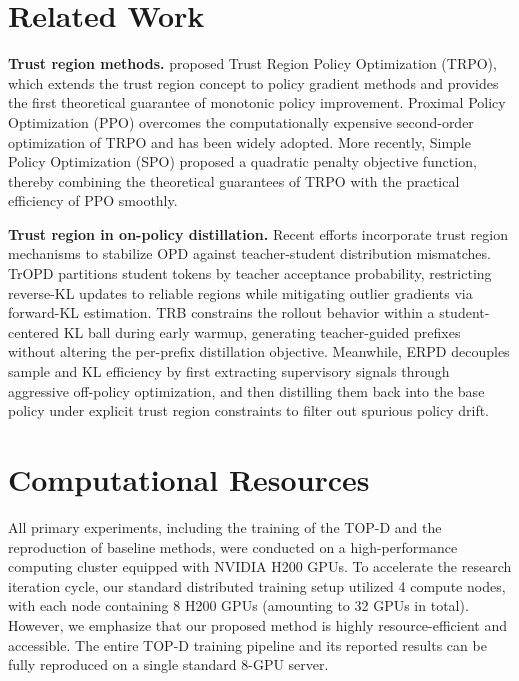 \documentclass{article}
\theoremstyle{plain}
\theoremstyle{definition}
\theoremstyle{remark}
\begin{document}
\section{Related Work}
\textbf{Trust region methods.} \citet{schulman2015trust} proposed Trust Region Policy Optimization (TRPO), which extends the trust region concept to policy gradient methods and provides the first theoretical guarantee of monotonic policy improvement. Proximal Policy Optimization (PPO) \citep{schulman2017proximal} overcomes the computationally expensive second-order optimization of TRPO and has been widely adopted. More recently, Simple Policy Optimization (SPO) \citep{xie2025simple} proposed a quadratic penalty objective function, thereby combining the theoretical guarantees of TRPO with the practical efficiency of PPO smoothly.


\textbf{Trust region in on-policy distillation.} Recent efforts incorporate trust region mechanisms to stabilize OPD against teacher-student distribution mismatches. TrOPD \citep{xing2026trust} partitions student tokens by teacher acceptance probability, restricting reverse-KL updates to reliable regions while mitigating outlier gradients via forward-KL estimation. TRB \citep{plyusov2026trust} constrains the rollout behavior within a student-centered KL ball during early warmup, generating teacher-guided prefixes without altering the per-prefix distillation objective. Meanwhile, ERPD \citep{chen2026extreme} decouples sample and KL efficiency by first extracting supervisory signals through aggressive off-policy optimization, and then distilling them back into the base policy under explicit trust region constraints to filter out spurious policy drift.











\section*{Computational Resources}
All primary experiments, including the training of the TOP-D and the reproduction of baseline methods, were conducted on a high-performance computing cluster equipped with NVIDIA H200 GPUs. To accelerate the research iteration cycle, our standard distributed training setup utilized 4 compute nodes, with each node containing 8 H200 GPUs (amounting to 32 GPUs in total). However, we emphasize that our proposed method is highly resource-efficient and accessible. The entire TOP-D training pipeline and its reported results can be fully reproduced on a single standard 8-GPU server.
\end{document}
